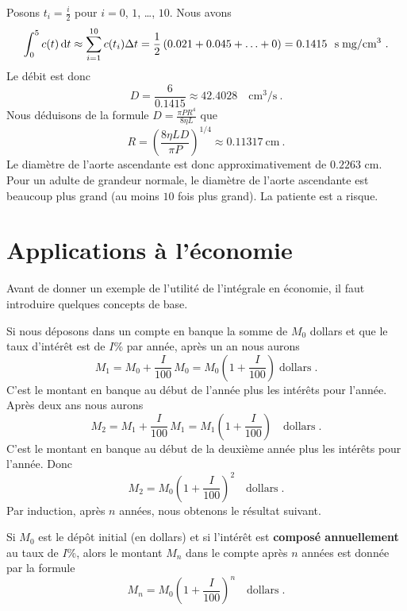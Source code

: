 {\begin{egg}
Posons $\displaystyle t_i = \frac{i}{2}$ pour $i=0$, $1$, \ldots,
$10$.  Nous avons
\[
\int_0^{5} c(t) \,\mathrm{d}t \approx \sum_{i=1}^{10} c(t_i) \Delta t
= \frac{1}{2} \left( 0.021 + 0.045 + \ldots + 0\right) = 0.1415
\ \text{ s\;mg/cm${^3}$} \ .
\]
Le débit est donc
\[
D = \frac{6}{0.1415} \approx 42.4028 \quad \text{cm$^3$/s} \ .
\]
Nous déduisons de la formule
$\displaystyle D = \frac{\pi P R^4}{8\eta L}$ que
\[
R = \left(\frac{8\eta L D}{\pi P}\right)^{1/4} \approx 0.11317 \
\text{cm} \ .
\]
Le diamètre de l'aorte ascendante est donc approximativement de $0.2263$ cm.
Pour un adulte de grandeur normale, le diamètre de l'aorte ascendante est
beaucoup plus grand (au moins $10$ fois plus grand).  La patiente est
a risque.
\end{egg}

\section{Applications à l'économie \eco}

Avant de donner un exemple de l'utilité de l'intégrale en économie, il faut
introduire quelques concepts de base.

Si nous déposons dans un compte en banque la somme de $M_0$ dollars et que le
taux d'intérêt est de $I$\% par année, après un an nous aurons
\[
M_1 = M_0 + \frac{I}{100}\,M_0 = M_0\left(1+\frac{I}{100}\right) \;
\text{dollars}\; .
\]
C'est le montant en banque au début de l'année plus les intérêts pour
l'année.  Après deux ans nous aurons
\[
M_2 = M_1 + \frac{I}{100}\,M_1 = M_1\left(1+\frac{I}{100}\right) \quad
\text{dollars}\; .
\]
C'est le montant en banque au début de la deuxième année plus les intérêts
pour l'année.  Donc
\[
M_2 = M_0\left(1+\frac{I}{100}\right)^2 \quad \text{dollars} \; .
\]
Par induction, après $n$ années, nous obtenons le résultat suivant.

\begin{focus}{\mth} 
Si $M_0$ est le dépôt initial (en dollars) et si l'intérêt est
{\bfseries composé annuellement}
au taux de $I$\%, alors le montant $M_n$ dans le compte après $n$
années est donnée par la formule
\[
M_n = M_0\left(1+\frac{I}{100}\right)^n \quad \text{dollars} \; .
\]
\end{focus}

}
